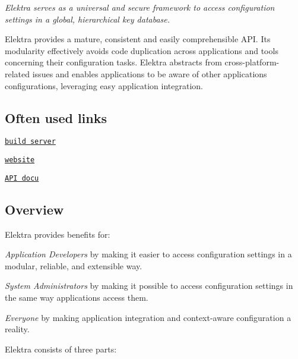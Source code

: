 {\itshape Elektra serves as a universal and secure framework to access configuration settings in a global, hierarchical key database.}



Elektra provides a mature, consistent and easily comprehensible A\+PI. Its modularity effectively avoids code duplication across applications and tools concerning their configuration tasks. Elektra abstracts from cross-\/platform-\/related issues and enables applications to be aware of other applications\textquotesingle{} configurations, leveraging easy application integration.

\subsection*{Often used links}


\begin{DoxyItemize}
\item \href{https://build.libelektra.org/}{\tt build server}
\item \href{https://www.libelektra.org}{\tt website}
\item \href{https://doc.libelektra.org/api/latest/html/}{\tt A\+PI docu}
\end{DoxyItemize}

\subsection*{Overview}

Elektra provides benefits for\+:


\begin{DoxyEnumerate}
\item {\itshape Application Developers} by making it easier to access configuration settings in a modular, reliable, and extensible way.
\item {\itshape System Administrators} by making it possible to access configuration settings in the same way applications access them.
\item {\itshape Everyone} by making application integration and context-\/aware configuration a reality.
\end{DoxyEnumerate}

Elektra consists of three parts\+:


